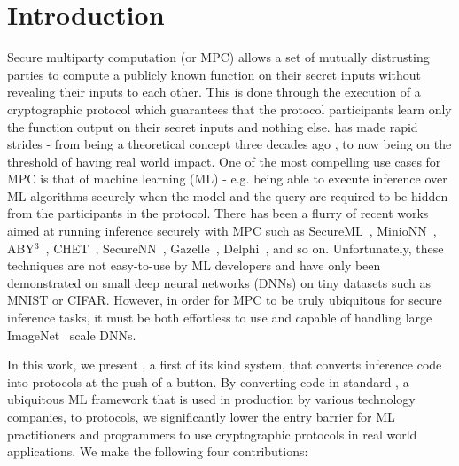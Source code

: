 \section{Introduction}
Secure multiparty computation (or MPC) allows a set of mutually distrusting parties to
compute a publicly known function on their secret inputs without revealing their
inputs to each other. This is done through the execution of a cryptographic protocol which guarantees that the protocol participants learn only the function output on their secret inputs and nothing else. 
\mpc has made rapid strides - from
being a theoretical concept three decades ago \cite{yao,gmw}, to now
being on the threshold of having real world impact.
One of the most compelling use cases for MPC is that of machine
learning (ML) - e.g. being able to execute inference over ML
algorithms securely when the model and the query are required to be
hidden from the participants in the protocol. There has been a flurry of
recent works aimed at running inference securely with MPC such as
SecureML~\cite{secureml}, MinioNN~\cite{minionn}, 
ABY$^3$~\cite{aby3}, CHET~\cite{chet},
SecureNN~\cite{securenn}, Gazelle~\cite{gazelle}, Delphi~\cite{delphi}, and so on.
 Unfortunately, these techniques are not easy-to-use by ML developers and have only been demonstrated on small deep
 neural networks (DNNs) on tiny datasets such as MNIST or CIFAR.
However, in order for MPC to be truly ubiquitous for secure inference
tasks, it must be both effortless to use and capable of handling large
ImageNet~\cite{imagenet} scale DNNs.

In this work, we present \cryptflow, a first of its kind system, that
converts \tensorflow \cite{tensorflow} inference code into \mpc protocols at the push of a button. By converting code in
standard \tensorflow, a ubiquitous ML framework that is used in production by
various technology companies, to \mpc protocols, we
significantly lower the entry barrier for ML practitioners and
programmers to use cryptographic \mpc protocols in real world
applications. We make the following four contributions:

